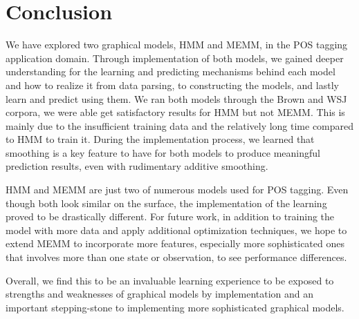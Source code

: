 \section{Conclusion}
We have explored two graphical models, HMM and MEMM, in the POS tagging application domain. Through implementation of both models, we gained deeper understanding for the learning and predicting mechanisms behind each model and how to realize it from data parsing, to constructing the models, and lastly learn and predict using them. We ran both models through the Brown and WSJ corpora, we were able get satisfactory results for HMM but not MEMM. This is mainly due to the insufficient training data and the relatively long time compared to HMM to train it. During the implementation process, we learned that smoothing is a key feature to have for both models to produce meaningful prediction results, even with rudimentary additive smoothing.

HMM and MEMM are just two of numerous models used for POS tagging. Even though both look similar on the surface, the implementation of the learning proved to be drastically different. For future work, in addition to training the model with more data and apply additional optimization techniques, we hope to extend MEMM to incorporate more features, especially more sophisticated ones that involves more than one state or observation, to see performance differences.

Overall, we find this to be an invaluable learning experience to be exposed to strengths and weaknesses of graphical models by implementation and an important stepping-stone to implementing more sophisticated graphical models.
